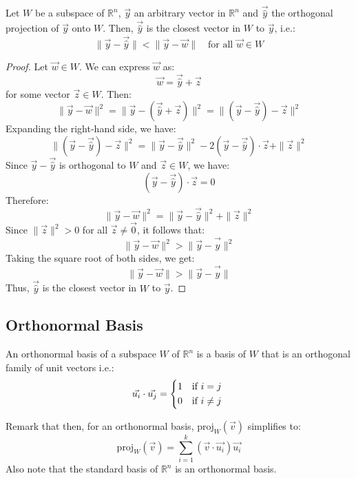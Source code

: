\begin{theorem}
    Let $W$ be a subspace of $\mathbb{R}^n$, $\vec{y}$ an arbitrary vector in $\mathbb{R}^n$ and $\vec{\hat{y}}$ the orthogonal projection of $\vec{y}$ onto $W$. Then, $\vec{\hat{y}}$ is the closest vector in $W$ to $\vec{y}$, i.e.:
    \[
        \|\vec{y} - \vec{\hat{y}}\| < \|\vec{y} - \vec{w}\| \quad \text{for all } \vec{w} \in W
    \]
\end{theorem}
\begin{proof}
    Let $\vec{w} \in W$. We can express $\vec{w}$ as:
    \[
        \vec{w} = \vec{\hat{y}} + \vec{z}
    \]
    for some vector $\vec{z} \in W$. Then:
    \[
        \|\vec{y} - \vec{w}\|^2 = \|\vec{y} - (\vec{\hat{y}} + \vec{z})\|^2 = \|(\vec{y} - \vec{\hat{y}}) - \vec{z}\|^2
    \]
    Expanding the right-hand side, we have:
    \[
        \|(\vec{y} - \vec{\hat{y}}) - \vec{z}\|^2 = \|\vec{y} - \vec{\hat{y}}\|^2 - 2(\vec{y} - \vec{\hat{y}}) \cdot \vec{z} + \|\vec{z}\|^2
    \]
    Since $\vec{y} - \vec{\hat{y}}$ is orthogonal to $W$ and $\vec{z} \in W$, we have:
    \[
        (\vec{y} - \vec{\hat{y}}) \cdot \vec{z} = 0
    \]
    Therefore:
    \[
        \|\vec{y} - \vec{w}\|^2 = \|\vec{y} - \vec{\hat{y}}\|^2 + \|\vec{z}\|^2
    \]
    Since $\|\vec{z}\|^2 > 0$ for all $\vec{z} \neq \vec{0}$, it follows that:
    \[
        \|\vec{y} - \vec{w}\|^2 > \|\vec{y} - \vec{\hat{y}}\|^2
    \]
    Taking the square root of both sides, we get:
    \[
        \|\vec{y} - \vec{w}\| > \|\vec{y} - \vec{\hat{y}}\|
    \]
    Thus, $\vec{\hat{y}}$ is the closest vector in $W$ to $\vec{y}$.
\end{proof}

\subsection{Orthonormal Basis}
\begin{definition}
    An orthonormal basis of a subspace $W$ of $\mathbb{R}^n$ is a basis of $W$ that is an orthogonal family of unit vectors i.e.:
    \[
        \vec{u_i} \cdot \vec{u_j} = \begin{cases*}
            1 & if $i = j$ \\
            0 & if $i \neq j$
        \end{cases*}
    \]
\end{definition}
Remark that then, for an orthonormal basis, $\text{proj}_W(\vec{v})$ simplifies to:
\[
    \text{proj}_W(\vec{v}) = \sum_{i=1}^{k} (\vec{v} \cdot \vec{u_i}) \vec{u_i}
\]
Also note that the standard basis of $\mathbb{R}^n$ is an orthonormal basis.

